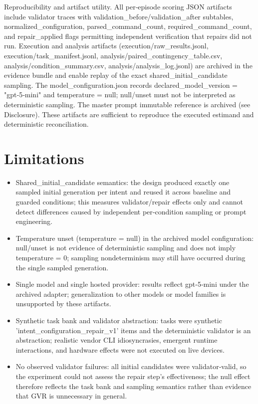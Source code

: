 \documentclass[conference]{IEEEtran}
\begin{document}
Reproducibility and artifact utility. All per‑episode scoring JSON artifacts include validator traces with validation\_before/validation\_after subtables, normalized\_configuration, parsed\_command\_count, required\_command\_count, and repair\_applied flags permitting independent verification that repairs did not run. Execution and analysis artifacts (execution/raw\_results.jsonl, execution/task\_manifest.jsonl, analysis/paired\_contingency\_table.csv, analysis/condition\_summary.csv, analysis/analysis\_log.jsonl) are archived in the evidence bundle and enable replay of the exact shared\_initial\_candidate sampling. The model\_configuration.json records declared\_model\_version = "gpt‑5‑mini" and temperature = null; null/unset must not be interpreted as deterministic sampling. The master prompt immutable reference is archived (see Disclosure). These artifacts are sufficient to reproduce the executed estimand and deterministic reconciliation.

\section{Limitations}
\begin{itemize}
\item Shared\_initial\_candidate semantics: the design produced exactly one sampled initial generation per intent and reused it across baseline and guarded conditions; this measures validator/repair effects only and cannot detect differences caused by independent per‑condition sampling or prompt engineering.
\item Temperature unset (temperature = null) in the archived model configuration: null/unset is not evidence of deterministic sampling and does not imply temperature = 0; sampling nondeterminism may still have occurred during the single sampled generation.
\item Single model and single hosted provider: results reflect gpt‑5‑mini under the archived adapter; generalization to other models or model families is unsupported by these artifacts.
\item Synthetic task bank and validator abstraction: tasks were synthetic 'intent\_configuration\_repair\_v1' items and the deterministic validator is an abstraction; realistic vendor CLI idiosyncrasies, emergent runtime interactions, and hardware effects were not executed on live devices.
\item No observed validator failures: all initial candidates were validator‑valid, so the experiment could not assess the repair step's effectiveness; the null effect therefore reflects the task bank and sampling semantics rather than evidence that GVR is unnecessary in general.
\end{itemize}
\end{document}
